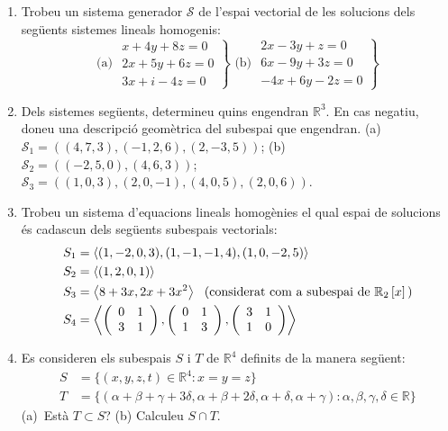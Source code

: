 \begin{enumerate}
\item Trobeu un sistema generador $\mathcal{S}$ de l’espai vectorial de les
solucions dels següents sistemes lineals homogenis:%
\[
\text{(a) \ }\left. 
\begin{array}{r}
x+4y+8z=0 \\ 
2x+5y+6z=0 \\ 
3x+i-4z=0%
\end{array}%
\right\} \text{ \ (b) \ }\left. 
\begin{array}{r}
2x-3y+z=0 \\ 
6x-9y+3z=0 \\ 
-4x+6y-2z=0%
\end{array}%
\right\} 
\]

\item Dels sistemes següents, determineu quins engendran $\mathbb{R}%
^{3}$. En cas negatiu, doneu una descripció geomètrica del
subespai que engendran. (a) $\mathcal{S}_{1}=((4,7,3),(-1,2,6),(2,-3,5))$;
(b) $\mathcal{S}_{2}=((-2,5,0),(4,6,3))$; $\mathcal{S}%
_{3}=((1,0,3),(2,0,-1),(4,0,5),(2,0,6))$. 

\item Trobeu un sistema d'equacions lineals homogènies el qual espai
de solucions és cadascun dels següents subespais vectorials:%
\begin{align*}
S_{1} &=\left\langle
(1,-2,0,3),(1,-1,-1,4),(1,0,-2,5)\right\rangle  \\
S_{2} &=\left\langle (1,2,0,1)\right\rangle  \\
S_{3} &=\left\langle 8+3x,2x+3x^{2}\right\rangle \text{ \
(considerat com a subespai de }\mathbb{R}_{2}\left[ x\right] \text{)} \\
S_{4} &=\left\langle \left( 
\begin{array}{cc}
0 & 1 \\ 
3 & 1%
\end{array}%
\right) ,\left( 
\begin{array}{cc}
0 & 1 \\ 
1 & 3%
\end{array}%
\right) ,\left( 
\begin{array}{cc}
3 & 1 \\ 
1 & 0%
\end{array}%
\right) \right\rangle 
\end{align*}

\item Es consideren els subespais $S$ i $T$ de $\mathbb{R%
}^{4}$ definits de la manera següent:%
\begin{align*}
S &=\{(x,y,z,t)\in \mathbb{R}^{4}:x=y=z\} \\
T &=\{(\alpha +\beta +\gamma +3\delta ,\alpha +\beta +2\delta
,\alpha +\delta ,\alpha +\gamma ):\alpha ,\beta ,\gamma ,\delta \in \mathbb{R%
}\}
\end{align*}%
(a)\ Està $T\subset S$? (b) Calculeu 
$S\cap T$.


\end{enumerate}
